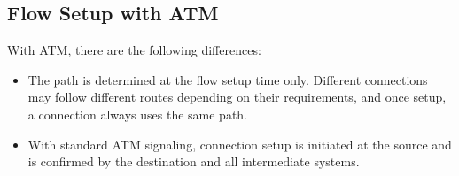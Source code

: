\subsection{Flow Setup with ATM}
With ATM, there are the following differences:
\begin{itemize}
    \item  The path is determined at the flow setup time only.
    Different connections may follow different routes depending on their
    requirements, and once setup, a connection always uses the same path.

    \item  With standard ATM signaling, connection setup is initiated at
    the source and is confirmed by the destination and all intermediate
    systems.
\end{itemize}
